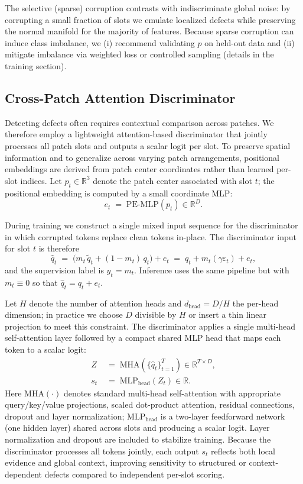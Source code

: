 The selective (sparse) corruption contrasts with indiscriminate global noise: by corrupting a small fraction of slots we emulate localized defects while preserving the normal manifold for the majority of features. Because sparse corruption can induce class imbalance, we (i) recommend validating \(p\) on held-out data and (ii) mitigate imbalance via weighted loss or controlled sampling (details in the training section).

\subsection{Cross-Patch Attention Discriminator}
Detecting defects often requires contextual comparison across patches. We therefore employ a lightweight attention-based discriminator that jointly processes all patch slots and outputs a scalar logit per slot. To preserve spatial information and to generalize across varying patch arrangements, positional embeddings are derived from patch center coordinates rather than learned per-slot indices. Let \(p_t\in\mathbb{R}^3\) denote the patch center associated with slot \(t\); the positional embedding is computed by a small coordinate MLP:
\begin{equation}
e_t \;=\; \mathrm{PE\text{-}MLP}(p_t) \in\mathbb{R}^D.
\end{equation}

During training we construct a single mixed input sequence for the discriminator in which corrupted tokens replace clean tokens in-place. The discriminator input for slot \(t\) is therefore
\begin{equation}
\hat{q}_t \;=\; \big(m_t\,\tilde{q}_t + (1-m_t)\,q_t\big) + e_t \;=\; q_t + m_t(\gamma\varepsilon_t) + e_t,
\end{equation}
and the supervision label is \(y_t=m_t\). Inference uses the same pipeline but with \(m_t\equiv 0\) so that \(\hat{q}_t=q_t+e_t\).

Let \(H\) denote the number of attention heads and \(d_{\mathrm{head}}=D/H\) the per-head dimension; in practice we choose \(D\) divisible by \(H\) or insert a thin linear projection to meet this constraint. The discriminator applies a single multi-head self-attention layer followed by a compact shared MLP head that maps each token to a scalar logit:
\begin{align}
Z \; &=\; \mathrm{MHA}(\{\hat{q}_t\}_{t=1}^T)\in\mathbb{R}^{T\times D},\\
s_t \; &=\; \mathrm{MLP}_{\mathrm{head}}(Z_t)\in\mathbb{R}.
\end{align}
Here \(\mathrm{MHA}(\cdot)\) denotes standard multi-head self-attention with appropriate query/key/value projections, scaled dot-product attention, residual connections, dropout and layer normalization; \(\mathrm{MLP}_{\mathrm{head}}\) is a two-layer feedforward network (one hidden layer) shared across slots and producing a scalar logit. Layer normalization and dropout are included to stabilize training. Because the discriminator processes all tokens jointly, each output \(s_t\) reflects both local evidence and global context, improving sensitivity to structured or context-dependent defects compared to independent per-slot scoring.


